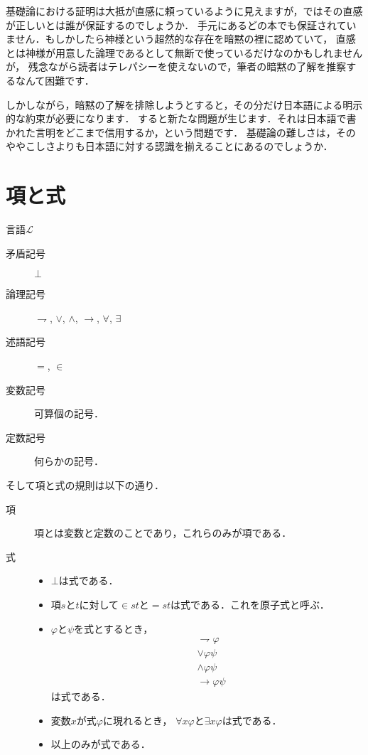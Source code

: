 \documentclass[a4j,10.5pt,oneside,openany]{jsbook}
\begin{document}

基礎論における証明は大抵が直感に頼っているように見えますが，ではその直感が正しいとは誰が保証するのでしょうか．
手元にあるどの本でも保証されていません．もしかしたら神様という超然的な存在を暗黙の裡に認めていて，
直感とは神様が用意した論理であるとして無断で使っているだけなのかもしれませんが，
残念ながら読者はテレパシーを使えないので，筆者の暗黙の了解を推察するなんて困難です．

しかしながら，暗黙の了解を排除しようとすると，その分だけ日本語による明示的な約束が必要になります．
すると新たな問題が生じます．それは日本語で書かれた言明をどこまで信用するか，という問題です．
基礎論の難しさは，そのややこしさよりも日本語に対する認識を揃えることにあるのでしょうか．

\section{項と式}
	言語$\mathcal{L}$
	\begin{description}
		\item[矛盾記号] $\bot$
		\item[論理記号]  $\rightharpoondown$, $\vee$, $\wedge$, $\rightarrow$,
			$\forall$, $\exists$
		\item[述語記号] $=$, $\in$
		\item[変数記号] 可算個の記号．
		\item[定数記号] 何らかの記号．
	\end{description}
	
	そして項と式の規則は以下の通り．
	\begin{description}
		\item[項] 項とは変数と定数のことであり，これらのみが項である．
		\item[式] 
			\begin{itemize}
				\item $\bot$は式である．
				\item 項$s$と$t$に対して$\in st$と$=st$は式である．これを原子式と呼ぶ．
				\item $\varphi$と$\psi$を式とするとき，
					\begin{align}
						&\rightharpoondown \varphi \\
						&\vee \varphi \psi \\
						&\wedge \varphi \psi \\
						&\rightarrow \varphi \psi
					\end{align}
					は式である．
				
				\item 変数$x$が式$\varphi$に現れるとき，
					$\forall x \varphi$と$\exists x \varphi$は式である．
				
				\item 以上のみが式である．
			\end{itemize}
	\end{description}
	
\end{document}
